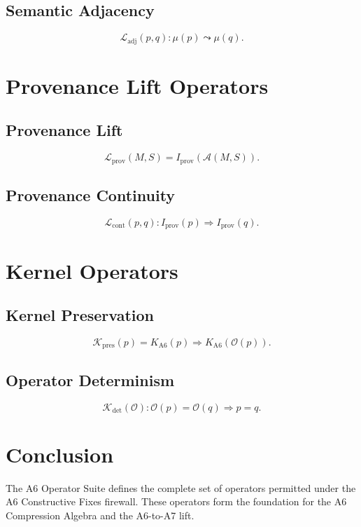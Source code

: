 \documentclass[11pt]{article}
\begin{document}
\subsection{Semantic Adjacency}
\[
\mathcal{L}_{\mathrm{adj}}(p,q) :
\mu(p) \leadsto \mu(q).
\]

\section{Provenance Lift Operators}

\subsection{Provenance Lift}
\[
\mathcal{L}_{\mathrm{prov}}(M,S)
  = I_{\mathrm{prov}}(\mathcal{A}(M,S)).
\]

\subsection{Provenance Continuity}
\[
\mathcal{L}_{\mathrm{cont}}(p,q) :
I_{\mathrm{prov}}(p) \Rightarrow I_{\mathrm{prov}}(q).
\]

\section{Kernel Operators}

\subsection{Kernel Preservation}
\[
\mathcal{K}_{\mathrm{pres}}(p)
  = K_{\mathrm{A6}}(p)
  \Rightarrow K_{\mathrm{A6}}(\mathcal{O}(p)).
\]

\subsection{Operator Determinism}
\[
\mathcal{K}_{\mathrm{det}}(\mathcal{O}) :
\mathcal{O}(p) = \mathcal{O}(q) \Rightarrow p = q.
\]

\section{Conclusion}

The A6 Operator Suite defines the complete set of operators permitted under
the A6 Constructive Fixes firewall. These operators form the foundation for
the A6 Compression Algebra and the A6-to-A7 lift.
\end{document}

